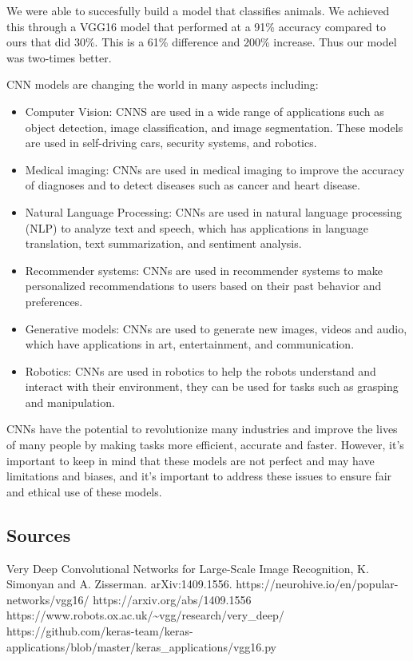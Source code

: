 \documentclass[
  letterpaper,
  DIV=11,
  numbers=noendperiod]{scrartcl}
\begin{document}
We were able to succesfully build a model that classifies animals. We
achieved this through a VGG16 model that performed at a 91\% accuracy
compared to ours that did 30\%. This is a 61\% difference and 200\%
increase. Thus our model was two-times better.

CNN models are changing the world in many aspects including:

\begin{itemize}
\item
  Computer Vision: CNNS are used in a wide range of applications such as
  object detection, image classification, and image segmentation. These
  models are used in self-driving cars, security systems, and robotics.
\item
  Medical imaging: CNNs are used in medical imaging to improve the
  accuracy of diagnoses and to detect diseases such as cancer and heart
  disease.
\item
  Natural Language Processing: CNNs are used in natural language
  processing (NLP) to analyze text and speech, which has applications in
  language translation, text summarization, and sentiment analysis.
\item
  Recommender systems: CNNs are used in recommender systems to make
  personalized recommendations to users based on their past behavior and
  preferences.
\item
  Generative models: CNNs are used to generate new images, videos and
  audio, which have applications in art, entertainment, and
  communication.
\item
  Robotics: CNNs are used in robotics to help the robots understand and
  interact with their environment, they can be used for tasks such as
  grasping and manipulation.
\end{itemize}

CNNs have the potential to revolutionize many industries and improve the
lives of many people by making tasks more efficient, accurate and
faster. However, it's important to keep in mind that these models are
not perfect and may have limitations and biases, and it's important to
address these issues to ensure fair and ethical use of these models.

\hypertarget{sources}{%
\subsection{Sources}\label{sources}}

Very Deep Convolutional Networks for Large-Scale Image Recognition, K.
Simonyan and A. Zisserman. arXiv:1409.1556.
https://neurohive.io/en/popular-networks/vgg16/
https://arxiv.org/abs/1409.1556
https://www.robots.ox.ac.uk/\textasciitilde vgg/research/very\_deep/
https://github.com/keras-team/keras-applications/blob/master/keras\_applications/vgg16.py
\end{document}
